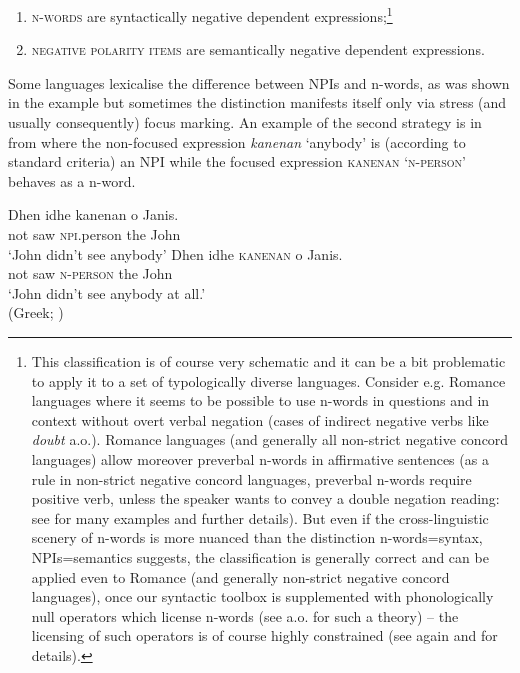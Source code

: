 \documentclass[output=paper,
]{langscibook}
\begin{document}
\largerpage
\begin{enumerate}
\def\labelenumi{\arabic{enumi})}
\item
  \textsc{n-words} are syntactically negative dependent expressions;\footnote{This classification is of course very schematic and it can be a bit problematic to apply it to a set of typologically diverse languages. Consider e.g. Romance languages where it seems to be possible to use n-words in questions and in context without overt verbal negation (cases of indirect negative verbs like \textit{doubt} a.o.). Romance languages (and generally all non-strict negative concord languages) allow moreover preverbal n-words in affirmative sentences (as a rule in non-strict negative concord languages, preverbal n-words require positive verb, unless the speaker wants to convey a double negation reading: see \cite{laka1990negation} for many examples and further details). But even if the cross-linguistic scenery of n-words is more nuanced than the distinction n-words=syntax, NPIs=semantics suggests, the classification is generally correct and can be applied even to Romance (and generally non-strict negative concord languages), once our syntactic toolbox is supplemented with phonologically null operators which license n-words (see \citealt{zeijlstra2004sentential} a.o. for such a theory) -- the licensing of such operators is of course highly constrained (see again \citealt{zeijlstra2004sentential} and \citealt{zeijlstra2008negative} for details).}
\item \textsc{negative polarity items} are semantically negative dependent expressions.
\end{enumerate}

\noindent Some languages lexicalise the difference between NPIs and n-words, as was shown in the example  but sometimes the distinction manifests itself only via stress (and usually consequently) focus marking. An example of the second strategy is in  from \cite{giannakidou2017landscape} where the non-focused expression \textit{kanenan} `anybody' is (according to standard criteria) an NPI while the focused expression \textsc{kanenan} `\textsc{n-person}' behaves as a n-word.\largerpage

\ea \label{ex-2}
\ea \gll Dhen idhe kanenan o Janis.\\
not saw \textsc{npi}.person the John\\
\glt `John didn't see anybody'
\ex \gll Dhen idhe \textsc{kanenan} o Janis.\\
not saw \textsc{n-person} the John\\
\glt `John didn't see anybody at all.'\\\xspace\hfill (Greek; \citealt[17]{giannakidou2017landscape})
\z
\z
\end{document}
